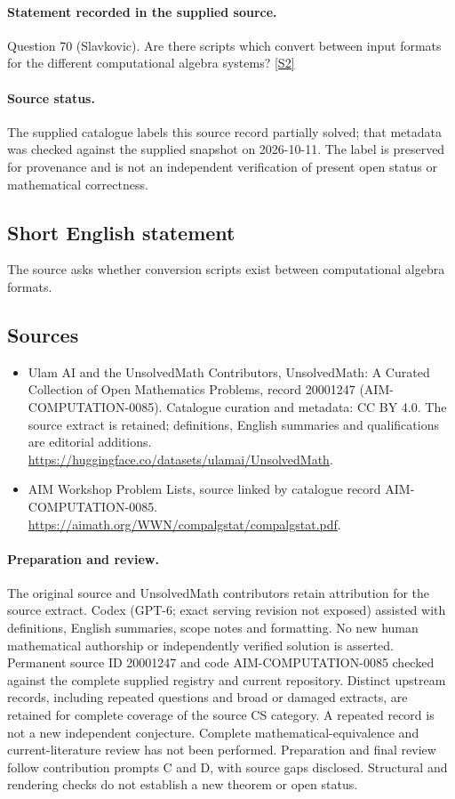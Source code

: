 \documentclass[11pt]{article}
\begin{document}
\paragraph{Statement recorded in the supplied source.}
Question 70 (Slavkovic). Are there scripts which convert between input formats for the different computational algebra systems? \href{https://aimath.org/WWN/compalgstat/compalgstat.pdf}{[S2]}
\paragraph{Source status.}
The supplied catalogue labels this source record partially solved; that metadata was checked against the supplied snapshot on 2026-10-11. The label is preserved for provenance and is not an independent verification of present open status or mathematical correctness.
\subsection{Short English statement}
The source asks whether conversion scripts exist between computational algebra formats.
\subsection{Sources}
\begin{itemize}
\item[S1] Ulam AI and the UnsolvedMath Contributors, UnsolvedMath: A Curated Collection of Open Mathematics Problems, record 20001247 (AIM-COMPUTATION-0085). Catalogue curation and metadata: CC BY 4.0. The source extract is retained; definitions, English summaries and qualifications are editorial additions.
\url{https://huggingface.co/datasets/ulamai/UnsolvedMath}.
\item[S2] AIM Workshop Problem Lists, source linked by catalogue record AIM-COMPUTATION-0085.
\url{https://aimath.org/WWN/compalgstat/compalgstat.pdf}.
\end{itemize}
\paragraph{Preparation and review.}
The original source and UnsolvedMath contributors retain attribution for the source extract. Codex (GPT-6; exact serving revision not exposed) assisted with definitions, English summaries, scope notes and formatting. No new human mathematical authorship or independently verified solution is asserted. Permanent source ID 20001247 and code AIM-COMPUTATION-0085 checked against the complete supplied registry and current repository. Distinct upstream records, including repeated questions and broad or damaged extracts, are retained for complete coverage of the source CS category. A repeated record is not a new independent conjecture. Complete mathematical-equivalence and current-literature review has not been performed. Preparation and final review follow contribution prompts C and D, with source gaps disclosed. Structural and rendering checks do not establish a new theorem or open status.
\label{end:20001247}
\end{document}
